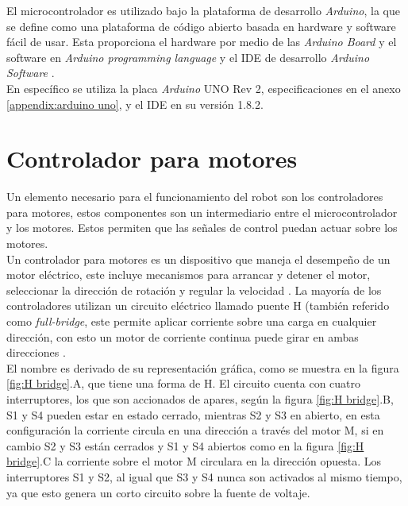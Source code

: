 \documentclass{iccmemoria}
\begin{document}
El microcontrolador es utilizado bajo la plataforma de desarrollo \emph{Arduino}, la que se define como una plataforma de código abierto basada en hardware y software fácil de usar. Esta proporciona el hardware por medio de las \emph{Arduino Board} y el software en \emph{Arduino programming language} y el IDE de desarrollo \emph{Arduino Software} \cite{arduino:introduction}.\\

En específico se utiliza la placa \emph{Arduino} UNO Rev 2, especificaciones en el anexo \ref{appendix:arduino uno}, y el IDE en su versión 1.8.2.\\

\section{Controlador para motores}

Un elemento necesario para el funcionamiento del robot son los controladores para motores, estos componentes son un intermediario entre el microcontrolador y los motores. Estos permiten que las señales de control puedan actuar sobre los motores.\\

Un controlador para motores es un dispositivo que maneja el desempeño de un motor eléctrico, este incluye mecanismos para arrancar y detener el motor, seleccionar la dirección de rotación y regular la velocidad \cite{siskind1963electrical}. La mayoría de los controladores utilizan un circuito eléctrico llamado puente H (también referido como \emph{full-bridge}, este permite aplicar corriente sobre una carga en cualquier dirección, con esto un motor de corriente continua puede girar en ambas direcciones \cite{williams2002microcontroller}.\\

El nombre es derivado de su representación gráfica, como se muestra en la figura \ref{fig:H bridge}.A, que tiene una forma de H. El circuito cuenta con cuatro interruptores, los que son accionados de apares, según la figura \ref{fig:H bridge}.B, S1 y S4 pueden estar en estado cerrado, mientras S2 y S3 en abierto, en esta configuración la corriente circula en una dirección a través del motor M, si en cambio S2 y S3 están cerrados y S1 y S4 abiertos como en la figura \ref{fig:H bridge}.C la corriente sobre el motor M circulara en la dirección opuesta. Los interruptores S1 y S2, al igual que S3 y S4 nunca son activados al mismo tiempo, ya que esto genera un corto circuito sobre la fuente de voltaje.\\
\end{document}
